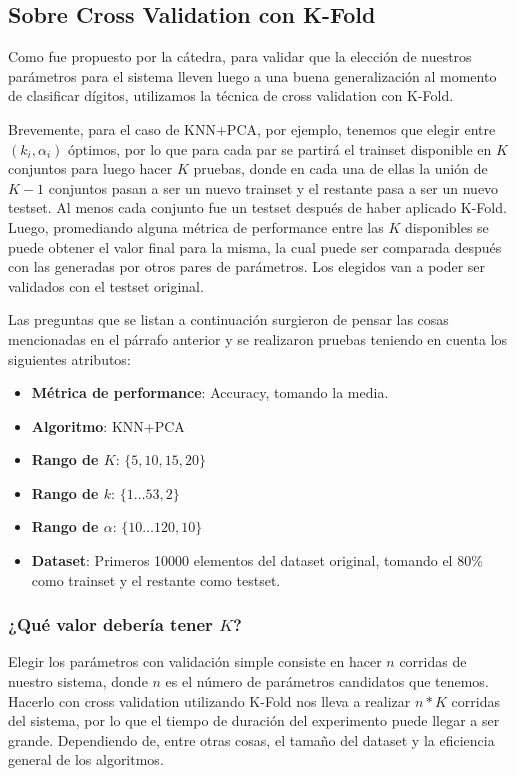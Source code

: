 \subsection{Sobre Cross Validation con K-Fold}

Como fue propuesto por la cátedra, para validar que la elección de nuestros parámetros para el sistema lleven luego a una buena generalización al momento de clasificar dígitos, utilizamos la técnica de cross validation con K-Fold.

Brevemente, para el caso de KNN+PCA, por ejemplo, tenemos que elegir entre $(k_i, \alpha_i)$ óptimos, por lo que para cada par se partirá el trainset disponible en $K$ conjuntos para luego hacer $K$ pruebas, donde en cada una de ellas la unión de $K-1$ conjuntos pasan a ser un nuevo trainset y el restante pasa a ser un nuevo testset. Al menos cada conjunto fue un testset después de haber aplicado K-Fold. Luego, promediando alguna métrica de performance entre las $K$ disponibles se puede obtener el valor final para la misma, la cual puede ser comparada después con las generadas por otros pares de parámetros. Los elegidos van a poder ser validados con el testset original.

Las preguntas que se listan a continuación surgieron de pensar las cosas mencionadas en el párrafo anterior y se realizaron pruebas teniendo en cuenta los siguientes atributos:

\begin{itemize}
    \item \textbf{Métrica de performance}: Accuracy, tomando la media.
    \item \textbf{Algoritmo}: KNN+PCA
    \item \textbf{Rango de $K$}: $\{5, 10, 15, 20\}$
    \item \textbf{Rango de $k$}: $\{1\dots53, 2\}$
    \item \textbf{Rango de $\alpha$}: $\{10\dots120, 10\}$
    \item \textbf{Dataset}: Primeros 10000 elementos del dataset original, tomando el $80\%$ como trainset y el restante como testset.
\end{itemize}

\subsubsection{¿Qué valor debería tener $K$?}\label{KFoldValueK}

Elegir los parámetros con validación simple consiste en hacer $n$ corridas de nuestro sistema, donde $n$ es el número de parámetros candidatos que tenemos. Hacerlo con cross validation utilizando K-Fold nos lleva a realizar $n * K$ corridas del sistema, por lo que el tiempo de duración del experimento puede llegar a ser grande. Dependiendo de, entre otras cosas, el tamaño del dataset y la eficiencia general de los algoritmos.

